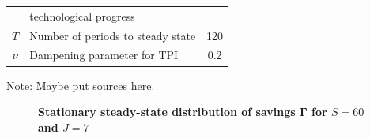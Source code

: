 \documentclass[letterpaper,12pt]{article}
\theoremstyle{definition}
\begin{document}
\begin{spacing}{1.5}
\begin{table}[htbp]
\begin{threeparttable}
\begin{tabular}{>{\small}c |>{\small}l |>{\small}c}
        & \quad technological progress & \\
        $T$ & Number of periods to steady state & 120 \\
        $\nu$ & Dampening parameter for TPI & 0.2 \\
        \hline\hline
      \end{tabular}
      \begin{tablenotes}
        \scriptsize{\item[]Note: Maybe put sources here.}
      \end{tablenotes}
      \end{threeparttable}
    \end{table}

    \begin{figure}[htb]\centering \captionsetup{width=4.0in}
      \caption{\label{FigSavSS}\textbf{Stationary steady-state distribution of savings $\bar{\bm{\Gamma}}$ for $S=60$ and $J=7$}}
    \end{figure}


\end{spacing}
\end{document}
